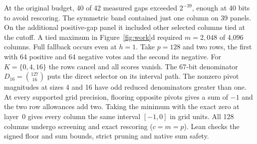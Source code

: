 At the original budget, 40 of 42 measured gaps exceeded $2^{-39}$, enough at 40 bits to avoid rescoring. The symmetric band contained just one column on 39 panels. On the additional positive-gap panel it included other selected columns tied at the cutoff. A tied maximum in Figure~\ref{fig:work}d required $m=2{,}048$ of 4,096 columns. Full fallback occurs even at $h=1$. Take $p=128$ and two rows, the first with 64 positive and 64 negative votes and the second its negative. For $K=\{0,4,16\}$ the rows cancel and all scores vanish. The 67-bit denominator $D_{16}=\binom{127}{16}$ puts the direct selector on its interval path. The nonzero pivot magnitudes at sizes 4 and 16 have odd reduced denominators greater than one. At every supported grid precision, flooring opposite pivots gives a sum of $-1$ and the two row allowances add two. Taking the minimum with the exact zero at layer~0 gives every column the same interval $[-1,0]$ in grid units. All 128 columns undergo screening and exact rescoring ($c=m=p$). Lean checks the signed floor and sum bounds, strict pruning and native sum safety.
